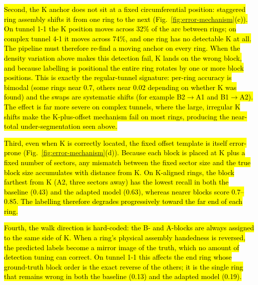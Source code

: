 \documentclass[a4paper,fleqn]{cas-dc}
\begin{document}
{\hl{Second, the K anchor does not sit at a fixed circumferential position: staggered ring assembly shifts it from one ring to the next (Fig.~\ref{fig:error-mechanism}(c)). On tunnel 1-1 the K position moves across 32\% of the arc between rings; on complex tunnel 4-1 it moves across 74\%, and one ring has no detectable K at all. The pipeline must therefore re-find a moving anchor on every ring. When the density variation above makes this detection fail, K lands on the wrong block, and because labelling is positional the entire ring rotates by one or more block positions. This is exactly the regular-tunnel signature: per-ring accuracy is bimodal (some rings near 0.7, others near 0.02 depending on whether K was found) and the swaps are systematic shifts (for example \mbox{B2$\rightarrow$A1} and \mbox{B1$\rightarrow$A2}). The effect is far more severe on complex tunnels, where the large, irregular K shifts make the K-plus-offset mechanism fail on most rings, producing the near-total under-segmentation seen above.}

\hl{Third, even when K is correctly located, the fixed offset template is itself error-prone (Fig.~\ref{fig:error-mechanism}(d)). Because each block is placed at K plus a fixed number of sectors, any mismatch between the fixed sector size and the true block size accumulates with distance from K. On K-aligned rings, the block farthest from K (A2, three sectors away) has the lowest recall in both the baseline (0.43) and the adapted model (0.63), whereas nearer blocks score 0.7--0.85. The labelling therefore degrades progressively toward the far end of each ring.}

\hl{Fourth, the walk direction is hard-coded: the B- and A-blocks are always assigned to the same side of K. When a ring's physical assembly handedness is reversed, the predicted labels become a mirror image of the truth, which no amount of detection tuning can correct. On tunnel 1-1 this affects the end ring whose ground-truth block order is the exact reverse of the others; it is the single ring that remains wrong in both the baseline (0.13) and the adapted model (0.19).}

}
\end{document}
